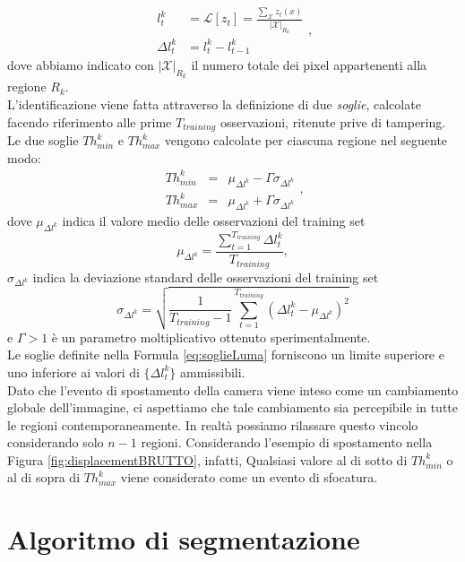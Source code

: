 \begin{equation}
	\label{eq:lumaRegions}
	\begin{array}{rl}
	l_t^k&  =  \mathcal{L}[z_t] = \frac{\sum_{\mathcal{X}} z_t(x) }{|\mathcal{X}|_{R_k}}\\
	\Delta l_t^k & = l_t^k-l_{t-1}^k 
	\end{array},
\end{equation}
dove abbiamo indicato con $|\mathcal{X}|_{R_k}$ il numero totale dei pixel appartenenti alla regione $R_k$.\\
L'identificazione viene fatta attraverso la definizione di due \textit{soglie}, calcolate facendo riferimento alle prime $T_{training}$ osservazioni, ritenute prive di tampering.
Le due soglie $Th_{min}^k$ e $Th_{max}^k$ vengono calcolate per ciascuna regione nel seguente modo:
\begin{equation}
\label{eq:soglieLuma}
\begin{array}{rcl}
Th_{min}^k & = & \mu_{\Delta l^k} -\Gamma \sigma_{\Delta l^k}\\
Th_{max}^k & = & \mu_{\Delta l^k} + \Gamma \sigma_{\Delta l^k}
\end{array},
\end{equation}
dove $\mu_{\Delta l^k}$ indica il valore medio delle osservazioni del training set
\begin{equation}
\mu_{\Delta l^k}  = \frac{\sum_{t = 1}^{T_{training}} \Delta l_t^k}{T_{training}}, \nonumber
\end{equation}
$\sigma_{\Delta l^k}$ indica la deviazione standard delle osservazioni del training set
\begin{equation}
\sigma_{\Delta l^k}  = \sqrt{\frac{1}{T_{training}-1}\sum_{t=1}^{T_{training}}\left(\Delta l_t^k - \mu_{\Delta l^k}\right)^2} \nonumber
\end{equation}
e $\Gamma>1$ \`e un parametro moltiplicativo ottenuto sperimentalmente.\\
Le soglie definite nella Formula \eqref{eq:soglieLuma} forniscono un limite superiore e uno inferiore ai valori di $\{\Delta l_t^k\}$ ammissibili.\\
Dato che l'evento di spostamento della camera viene inteso come un cambiamento globale dell'immagine, ci aspettiamo che tale cambiamento sia percepibile in tutte le regioni contemporaneamente. 
In realt\`a possiamo rilassare questo vincolo considerando solo $n-1$ regioni.
Considerando l'esempio di spostamento nella Figura \ref{fig:displacementBRUTTO}, infatti,  
Qualsiasi valore al di sotto di $Th_{min}^k$ o al di sopra di $Th_{max}^k$ viene considerato come un evento di sfocatura.\\ 

\section{Algoritmo di segmentazione}
\label{segmentazione}
